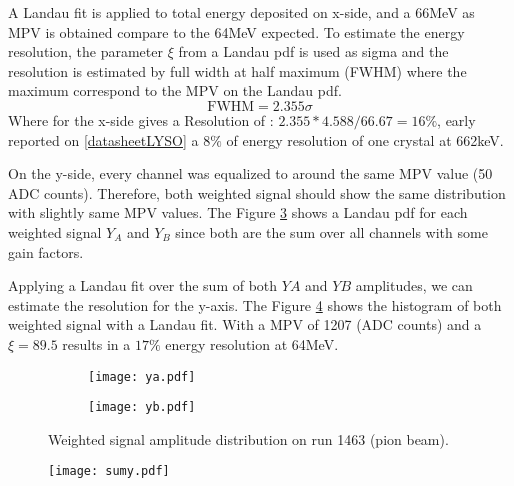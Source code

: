 A Landau fit is applied to total energy deposited on x-side, and a 66MeV as MPV is obtained compare to the 64MeV
expected. To estimate the energy resolution, the parameter $\xi$ from a Landau pdf is used as sigma and the
resolution is estimated by full width at half maximum (FWHM) where the maximum correspond to the MPV on the Landau pdf. 
\begin{equation}
\mathrm{FWHM} = 2.355 \sigma
\end{equation}
Where for the x-side gives a Resolution of : $2.355*4.588/66.67=16\%$, early reported on \ref{datasheetLYSO} a $8\%$ of
energy resolution of one crystal at 662keV.\par

On the y-side, every channel was equalized to around the same MPV value (50 ADC counts). Therefore, both weighted signal
should show the same distribution with slightly same MPV values. The Figure \ref{y_signals} shows a Landau pdf for each
weighted signal $Y_A$ and $Y_B$ since both are the sum over all channels with some gain factors.\par

Applying a Landau fit over the sum of both $YA$ and $YB$ amplitudes, we can estimate the resolution for the y-axis.
The Figure \ref{y_sumab} shows the histogram of both weighted signal with a Landau fit. With a MPV of 1207 (ADC counts)
and a $\xi=89.5$ results in a $17\%$ energy resolution at 64MeV.\par 

\begin{figure}[ht]
	\hspace*{\fill}
	\centering
		\begin{subfigure}[b]{0.45\textwidth}
			\texttt{[image: ya.pdf]}
			\caption{}\label{}
		\end{subfigure}
		\hfill
		\begin{subfigure}[b]{0.45\textwidth}
			\texttt{[image: yb.pdf]}
			\caption{}\label{}
		\end{subfigure}
\hspace*{\fill}
	\caption{Weighted signal amplitude distribution on run 1463 (pion beam).}\label{y_signals}
\end{figure}

\begin{figure}[ht]
	\hspace*{\fill}
	\centering
	\texttt{[image: sumy.pdf]}
	\hspace*{\fill}
	\caption{}\label{y_sumab}
\end{figure}

